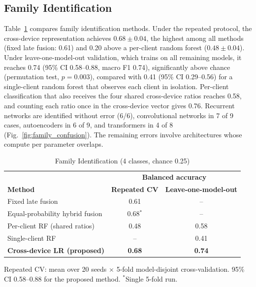 \documentclass[conference]{IEEEtran}
\begin{document}
\subsection{Family Identification}
Table~\ref{tab:family_methods} compares family identification methods. Under the
repeated protocol, the cross-device representation achieves $0.68 \pm 0.04$,
the highest among all methods (fixed late fusion: 0.61) and 0.20 above a
per-client random forest ($0.48 \pm 0.04$). Under leave-one-model-out validation, which
trains on all remaining models, it reaches 0.74 (95\% CI 0.58--0.88, macro F1
0.74), significantly above chance (permutation test, $p = 0.003$), compared with
0.41 (95\% CI 0.29--0.56) for a single-client random forest that observes each
client in isolation. Per-client classification that also receives the four
shared cross-device ratios reaches 0.58, and counting each ratio once in the
cross-device vector gives 0.76. Recurrent networks are identified without
error (6/6), convolutional networks in 7 of 9 cases, autoencoders in 6 of 9, and
transformers in 4 of 8 (Fig.~\ref{fig:family_confusion}). The remaining errors
involve architectures whose compute per parameter overlaps.

\begin{table}[!htbp]
\centering
\caption{Family Identification (4 classes, chance 0.25)}
\label{tab:family_methods}
\scriptsize
\renewcommand{\arraystretch}{1.08}
\setlength{\tabcolsep}{3pt}
\begin{tabular}{lcc}
\hline
 & \multicolumn{2}{c}{\textbf{Balanced accuracy}} \\
\textbf{Method} & \textbf{Repeated CV} & \textbf{Leave-one-model-out} \\
\hline
Fixed late fusion                  & 0.61 & -- \\
Equal-probability hybrid fusion    & 0.68$^{*}$ & -- \\
Per-client RF (shared ratios)      & 0.48 & 0.58 \\
Single-client RF                   & --   & 0.41 \\
\textbf{Cross-device LR (proposed)} & \textbf{0.68} & \textbf{0.74} \\
\hline
\end{tabular}

\vspace{2pt}
\parbox{0.95\columnwidth}{\scriptsize Repeated CV: mean over 20 seeds
$\times$ 5-fold model-disjoint cross-validation. 95\% CI 0.58--0.88 for the
proposed method. $^{*}$Single 5-fold run.}
\end{table}
\end{document}
